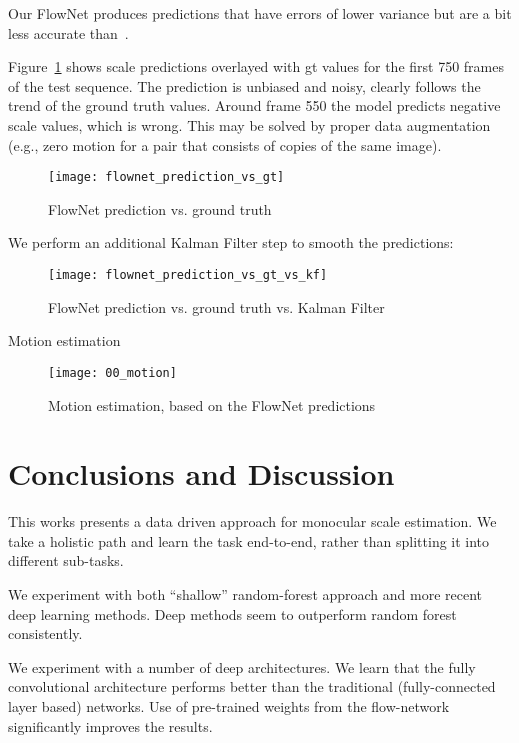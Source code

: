 Our FlowNet produces predictions that have errors of lower variance
but are a bit less accurate than~\cite{frost2016}.

Figure~\ref{fig:pred_vs_gt} shows scale predictions overlayed with gt
values for the first 750 frames of the test sequence.  The prediction
is unbiased and noisy, clearly follows the trend of the ground truth
values.  Around frame 550 the model predicts negative scale values,
which is wrong.  This may be solved by proper data augmentation (e.g.,
zero motion for a pair that consists of copies of the same image).

\begin{figure}[!ht]
  \centering
  \texttt{[image: flownet\_prediction\_vs\_gt]}
  \caption{FlowNet prediction vs. ground truth}
  \label{fig:pred_vs_gt}
\end{figure}

We perform an additional Kalman Filter step to smooth the predictions:
\begin{figure}[!ht]
  \centering
  \texttt{[image: flownet\_prediction\_vs\_gt\_vs\_kf]}
  \caption{FlowNet prediction vs. ground truth vs. Kalman Filter}
  \label{fig:pred_vs_gt_vs_ekf}
\end{figure}

Motion estimation
\begin{figure}[!ht]
  \centering
  \texttt{[image: 00\_motion]}
  \caption{Motion estimation, based on the FlowNet predictions}
  \label{fig:00_motion}
\end{figure}

\section{Conclusions and Discussion}

This works presents a data driven approach for monocular scale
estimation.  We take a holistic path and learn the task end-to-end,
rather than splitting it into different sub-tasks.

We experiment with both ``shallow'' random-forest approach and more
recent deep learning methods.  Deep methods seem to outperform random
forest consistently.

We experiment with a number of deep architectures. We learn that the
fully convolutional architecture performs better than the traditional
(fully-connected layer based) networks.  Use of pre-trained weights
from the flow-network significantly improves the results.

